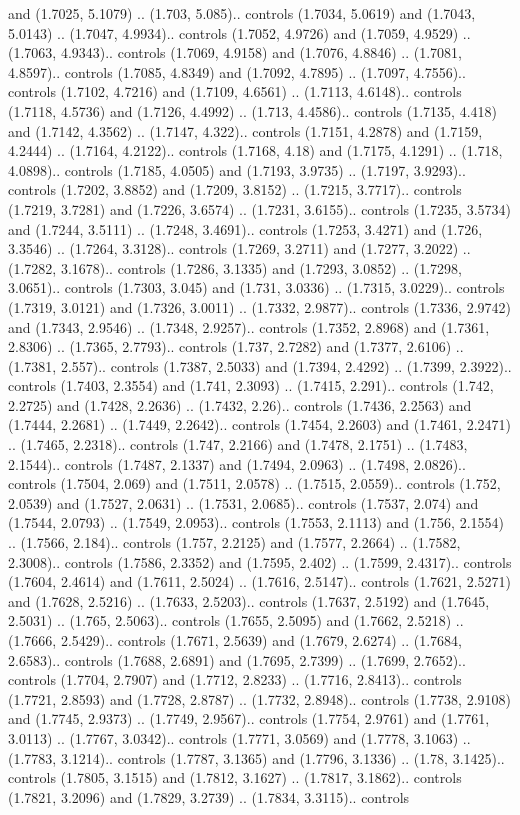 and (1.7025, 5.1079) .. (1.703, 5.085).. controls (1.7034, 5.0619) and (1.7043, 5.0143) .. (1.7047, 4.9934).. controls (1.7052, 4.9726) and (1.7059, 4.9529) .. (1.7063, 4.9343).. controls (1.7069, 4.9158) and (1.7076, 4.8846) .. (1.7081, 4.8597).. controls (1.7085, 4.8349) and (1.7092, 4.7895) .. (1.7097, 4.7556).. controls (1.7102, 4.7216) and (1.7109, 4.6561) .. (1.7113, 4.6148).. controls (1.7118, 4.5736) and (1.7126, 4.4992) .. (1.713, 4.4586).. controls (1.7135, 4.418) and (1.7142, 4.3562) .. (1.7147, 4.322).. controls (1.7151, 4.2878) and (1.7159, 4.2444) .. (1.7164, 4.2122).. controls (1.7168, 4.18) and (1.7175, 4.1291) .. (1.718, 4.0898).. controls (1.7185, 4.0505) and (1.7193, 3.9735) .. (1.7197, 3.9293).. controls (1.7202, 3.8852) and (1.7209, 3.8152) .. (1.7215, 3.7717).. controls (1.7219, 3.7281) and (1.7226, 3.6574) .. (1.7231, 3.6155).. controls (1.7235, 3.5734) and (1.7244, 3.5111) .. (1.7248, 3.4691).. controls (1.7253, 3.4271) and (1.726, 3.3546) .. (1.7264, 3.3128).. controls (1.7269, 3.2711) and (1.7277, 3.2022) .. (1.7282, 3.1678).. controls (1.7286, 3.1335) and (1.7293, 3.0852) .. (1.7298, 3.0651).. controls (1.7303, 3.045) and (1.731, 3.0336) .. (1.7315, 3.0229).. controls (1.7319, 3.0121) and (1.7326, 3.0011) .. (1.7332, 2.9877).. controls (1.7336, 2.9742) and (1.7343, 2.9546) .. (1.7348, 2.9257).. controls (1.7352, 2.8968) and (1.7361, 2.8306) .. (1.7365, 2.7793).. controls (1.737, 2.7282) and (1.7377, 2.6106) .. (1.7381, 2.557).. controls (1.7387, 2.5033) and (1.7394, 2.4292) .. (1.7399, 2.3922).. controls (1.7403, 2.3554) and (1.741, 2.3093) .. (1.7415, 2.291).. controls (1.742, 2.2725) and (1.7428, 2.2636) .. (1.7432, 2.26).. controls (1.7436, 2.2563) and (1.7444, 2.2681) .. (1.7449, 2.2642).. controls (1.7454, 2.2603) and (1.7461, 2.2471) .. (1.7465, 2.2318).. controls (1.747, 2.2166) and (1.7478, 2.1751) .. (1.7483, 2.1544).. controls (1.7487, 2.1337) and (1.7494, 2.0963) .. (1.7498, 2.0826).. controls (1.7504, 2.069) and (1.7511, 2.0578) .. (1.7515, 2.0559).. controls (1.752, 2.0539) and (1.7527, 2.0631) .. (1.7531, 2.0685).. controls (1.7537, 2.074) and (1.7544, 2.0793) .. (1.7549, 2.0953).. controls (1.7553, 2.1113) and (1.756, 2.1554) .. (1.7566, 2.184).. controls (1.757, 2.2125) and (1.7577, 2.2664) .. (1.7582, 2.3008).. controls (1.7586, 2.3352) and (1.7595, 2.402) .. (1.7599, 2.4317).. controls (1.7604, 2.4614) and (1.7611, 2.5024) .. (1.7616, 2.5147).. controls (1.7621, 2.5271) and (1.7628, 2.5216) .. (1.7633, 2.5203).. controls (1.7637, 2.5192) and (1.7645, 2.5031) .. (1.765, 2.5063).. controls (1.7655, 2.5095) and (1.7662, 2.5218) .. (1.7666, 2.5429).. controls (1.7671, 2.5639) and (1.7679, 2.6274) .. (1.7684, 2.6583).. controls (1.7688, 2.6891) and (1.7695, 2.7399) .. (1.7699, 2.7652).. controls (1.7704, 2.7907) and (1.7712, 2.8233) .. (1.7716, 2.8413).. controls (1.7721, 2.8593) and (1.7728, 2.8787) .. (1.7732, 2.8948).. controls (1.7738, 2.9108) and (1.7745, 2.9373) .. (1.7749, 2.9567).. controls (1.7754, 2.9761) and (1.7761, 3.0113) .. (1.7767, 3.0342).. controls (1.7771, 3.0569) and (1.7778, 3.1063) .. (1.7783, 3.1214).. controls (1.7787, 3.1365) and (1.7796, 3.1336) .. (1.78, 3.1425).. controls (1.7805, 3.1515) and (1.7812, 3.1627) .. (1.7817, 3.1862).. controls (1.7821, 3.2096) and (1.7829, 3.2739) .. (1.7834, 3.3115).. controls 